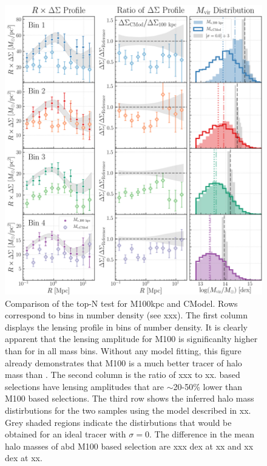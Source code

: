 \documentclass[a4paper,fleqn,usenatbib]{mnras}
\begin{document}
  \begin{figure}
      \centering
      \includegraphics[width=15cm]{figure/topn_dsigma_m100_cmod_compare}
      \caption{Comparison of the top-N test for M100kpc and CModel. Rows correspond to bins in number density (see xxx). The first column displays the lensing profile \dsigma{} in bins of number density. It is clearly apparent that the lensing amplitude for M100 is significanlty higher than for \mcmodel{} in all mass bins. Without any model fitting, this figure already demonstrates that M100 is a much better tracer of halo mass than \mcmodel{}. The second column is the ratio of xxx to xx. \mcmodel{} based selections have lensing amplitudes that are $\sim$20-50\% lower than M100 based selections. The third row shows the inferred halo mass distirbutions for the two samples using the model described in xx. Grey shaded regions indicate the distirbutions that would be obtained for an ideal tracer with $\sigma=0$. The difference in the mean halo masses of \mcmodel{} abd M100 based selection are xxx dex at xx and xx dex at xx. 
          }
      \label{fig:m100_cmod}
  \end{figure}
\end{document}
